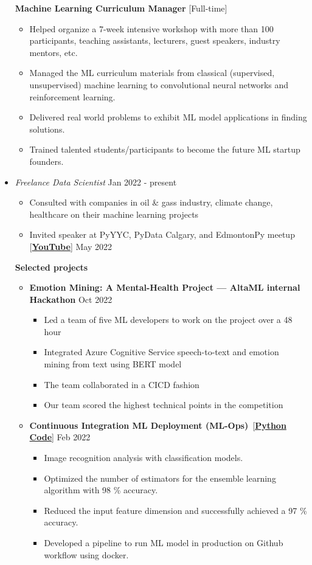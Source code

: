 \documentclass[11pt,a4paper,sans]{moderncv} %
\begin{document}
\begin{itemize}
	\textbf{Machine Learning Curriculum Manager} [Full-time]
	\begin{itemize}
		\item Helped organize a 7-week intensive workshop with more than 100 participants, teaching assistants, lecturers, guest speakers, industry mentors, etc.
		\item Managed the ML curriculum materials from classical (supervised, unsupervised) machine learning to convolutional neural networks and reinforcement learning.
		\item Delivered real world problems to exhibit ML model applications in finding solutions.
		\item Trained talented students/participants to become the future ML startup founders.
	\end{itemize}

	\item \href{https://hadi2525.github.io}{} \emph{Freelance Data Scientist} \hfill Jan 2022 - present
	\begin{itemize}
		\item Consulted with companies in oil \& gass industry, climate change, healthcare on their machine learning projects
		\item Invited speaker at PyYYC, PyData Calgary, and EdmontonPy meetup [\href{https://www.youtube.com/watch?v=4S_QGDHTICw}{\textbf{YouTube}]} \hfill May 2022
	\end{itemize}
	\textbf{Selected projects}
	\begin{itemize}
		\item \textbf{Emotion Mining: A Mental-Health Project --- AltaML internal Hackathon} \hfill Oct 2022
		\begin{itemize}
			\item Led a team of five ML developers to work on the project over a 48 hour
			\item Integrated Azure Cognitive Service speech-to-text and emotion mining from text using BERT model
			\item The team collaborated in a CICD fashion
			\item Our team scored the highest technical points in the competition
		\end{itemize}
		
		\item \textbf{Continuous Integration ML Deployment (ML-Ops)}~[\href{https://github.com/Hadi2525/ML_production_01/tree/Hadi2525-patch-1}{\textbf{Python Code}}] \hfill Feb 2022
		\begin{itemize}
			\item Image recognition analysis with classification models.
			\item Optimized the number of estimators for the ensemble learning algorithm with 98 \% accuracy.
			\item Reduced the input feature dimension and successfully achieved a 97 \% accuracy.
			\item Developed a pipeline to run ML model in production on Github workflow using docker.
		\end{itemize}
		

\end{itemize}
\end{itemize}
\end{document}

